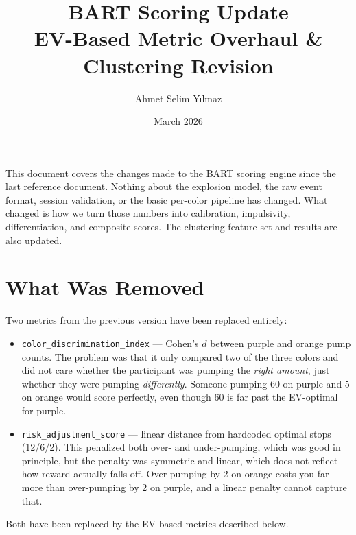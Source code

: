 \documentclass[11pt,a4paper]{article}
\title{\textbf{BART Scoring Update}\\[0.3em]
\large EV-Based Metric Overhaul \& Clustering Revision}
\author{Ahmet Selim Y{\i}lmaz}
\date{March 2026}
\begin{document}
\maketitle
\thispagestyle{fancy}

This document covers the changes made to the BART scoring engine since the
last reference document. Nothing about the explosion model, the raw event
format, session validation, or the basic per-color pipeline has changed.
What changed is how we turn those numbers into calibration, impulsivity,
differentiation, and composite scores. The clustering feature set and
results are also updated.

\tableofcontents
\vspace{1em}


\section{What Was Removed}

Two metrics from the previous version have been replaced entirely:

\begin{itemize}
    \item \texttt{color\_discrimination\_index} --- Cohen's $d$ between
          purple and orange pump counts. The problem was that it only
          compared two of the three colors and did not care whether the
          participant was pumping the \emph{right amount}, just whether
          they were pumping \emph{differently}. Someone pumping 60 on
          purple and 5 on orange would score perfectly, even though 60 is
          far past the EV-optimal for purple.

    \item \texttt{risk\_adjustment\_score} --- linear distance from
          hardcoded optimal stops (12/6/2). This penalized both over-
          and under-pumping, which was good in principle, but the penalty
          was symmetric and linear, which does not reflect how reward
          actually falls off. Over-pumping by 2 on orange costs you far
          more than over-pumping by 2 on purple, and a linear penalty
          cannot capture that.
\end{itemize}

Both have been replaced by the EV-based metrics described below.


\end{document}
